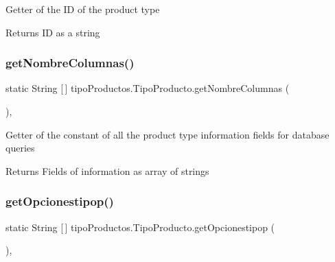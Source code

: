 Getter of the ID of the product type

\begin{DoxyReturn}{Returns}
ID as a string 
\end{DoxyReturn}
\mbox{\label{classtipo_productos_1_1_tipo_producto_a09ad6d5a9a33a7822d51ad9134aa670e}} 
\subsubsection{\texorpdfstring{get\+Nombre\+Columnas()}{getNombreColumnas()}}
{\footnotesize\ttfamily static String \mbox{[}$\,$\mbox{]} tipo\+Productos.\+Tipo\+Producto.\+get\+Nombre\+Columnas (\begin{DoxyParamCaption}{ }\end{DoxyParamCaption})\hspace{0.3cm}{\ttfamily [inline]}, {\ttfamily [static]}}

Getter of the constant of all the product type information fields for database queries

\begin{DoxyReturn}{Returns}
Fields of information as array of strings 
\end{DoxyReturn}
\mbox{\label{classtipo_productos_1_1_tipo_producto_a9202294408afa6fde0a50eb4ac09c7de}} 
\subsubsection{\texorpdfstring{get\+Opcionestipop()}{getOpcionestipop()}}
{\footnotesize\ttfamily static String \mbox{[}$\,$\mbox{]} tipo\+Productos.\+Tipo\+Producto.\+get\+Opcionestipop (\begin{DoxyParamCaption}{ }\end{DoxyParamCaption})\hspace{0.3cm}{\ttfamily [inline]}, {\ttfamily [static]}}

